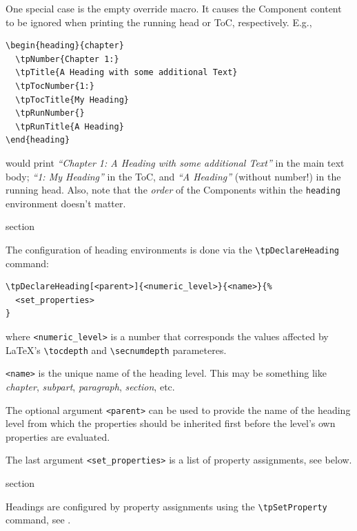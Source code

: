 One special case is the empty override
macro. It causes the Component content to be ignored when printing the
running head or ToC, respectively. E.g.,
\begin{lstlisting}[style=tex]
\begin{heading}{chapter}
  \tpNumber{Chapter 1:}
  \tpTitle{A Heading with some additional Text}
  \tpTocNumber{1:}
  \tpTocTitle{My Heading}
  \tpRunNumber{}
  \tpRunTitle{A Heading}
\end{heading}
\end{lstlisting}
would print \textit{“Chapter 1: A Heading with some additional Text”}
in the main text body; \textit{“1: My Heading”} in the ToC, and
\textit{“A Heading”} (without number!) in the running head. Also, note
that the \textit{order} of the Components within the \texttt{heading}
environment doesn't matter.

\begin{heading}[label=sec:hdg:decl]{section}
\end{heading}

The configuration of heading environments is done via the
\lstinline{\tpDeclareHeading} command:
\begin{lstlisting}[style=tex]
\tpDeclareHeading[<parent>]{<numeric_level>}{<name>}{%
  <set_properties>
}
\end{lstlisting}
where \lstinline{<numeric_level>} is a number that corresponds the
values affected by \LaTeX's \lstinline{\tocdepth} and
\lstinline{\secnumdepth} parameteres.

\lstinline{<name>} is the unique name of the heading level. This may
be something like \textit{chapter}, \textit{subpart},
\textit{paragraph}, \textit{section}, etc.

The optional argument \lstinline{<parent>} can be used to provide the
name of the heading level from which the properties should be
inherited first before the level's own properties are evaluated.

The last argument \lstinline{<set_properties>} is a list of property
assignments, see below.


\begin{heading}[label=sec:hdg:props]{section}
\end{heading}

Headings are configured by property assignments using the
\lstinline{\tpSetProperty} command, see .

